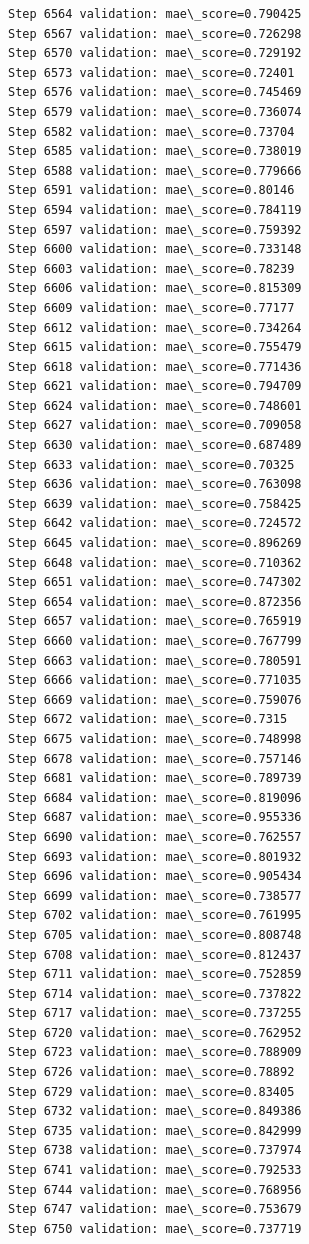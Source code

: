 \documentclass[11pt]{article}
\begin{document}
\begin{Verbatim}[commandchars=\\\{\}]
Step 6564 validation: mae\_score=0.790425
Step 6567 validation: mae\_score=0.726298
Step 6570 validation: mae\_score=0.729192
Step 6573 validation: mae\_score=0.72401
Step 6576 validation: mae\_score=0.745469
Step 6579 validation: mae\_score=0.736074
Step 6582 validation: mae\_score=0.73704
Step 6585 validation: mae\_score=0.738019
Step 6588 validation: mae\_score=0.779666
Step 6591 validation: mae\_score=0.80146
Step 6594 validation: mae\_score=0.784119
Step 6597 validation: mae\_score=0.759392
Step 6600 validation: mae\_score=0.733148
Step 6603 validation: mae\_score=0.78239
Step 6606 validation: mae\_score=0.815309
Step 6609 validation: mae\_score=0.77177
Step 6612 validation: mae\_score=0.734264
Step 6615 validation: mae\_score=0.755479
Step 6618 validation: mae\_score=0.771436
Step 6621 validation: mae\_score=0.794709
Step 6624 validation: mae\_score=0.748601
Step 6627 validation: mae\_score=0.709058
Step 6630 validation: mae\_score=0.687489
Step 6633 validation: mae\_score=0.70325
Step 6636 validation: mae\_score=0.763098
Step 6639 validation: mae\_score=0.758425
Step 6642 validation: mae\_score=0.724572
Step 6645 validation: mae\_score=0.896269
Step 6648 validation: mae\_score=0.710362
Step 6651 validation: mae\_score=0.747302
Step 6654 validation: mae\_score=0.872356
Step 6657 validation: mae\_score=0.765919
Step 6660 validation: mae\_score=0.767799
Step 6663 validation: mae\_score=0.780591
Step 6666 validation: mae\_score=0.771035
Step 6669 validation: mae\_score=0.759076
Step 6672 validation: mae\_score=0.7315
Step 6675 validation: mae\_score=0.748998
Step 6678 validation: mae\_score=0.757146
Step 6681 validation: mae\_score=0.789739
Step 6684 validation: mae\_score=0.819096
Step 6687 validation: mae\_score=0.955336
Step 6690 validation: mae\_score=0.762557
Step 6693 validation: mae\_score=0.801932
Step 6696 validation: mae\_score=0.905434
Step 6699 validation: mae\_score=0.738577
Step 6702 validation: mae\_score=0.761995
Step 6705 validation: mae\_score=0.808748
Step 6708 validation: mae\_score=0.812437
Step 6711 validation: mae\_score=0.752859
Step 6714 validation: mae\_score=0.737822
Step 6717 validation: mae\_score=0.737255
Step 6720 validation: mae\_score=0.762952
Step 6723 validation: mae\_score=0.788909
Step 6726 validation: mae\_score=0.78892
Step 6729 validation: mae\_score=0.83405
Step 6732 validation: mae\_score=0.849386
Step 6735 validation: mae\_score=0.842999
Step 6738 validation: mae\_score=0.737974
Step 6741 validation: mae\_score=0.792533
Step 6744 validation: mae\_score=0.768956
Step 6747 validation: mae\_score=0.753679
Step 6750 validation: mae\_score=0.737719

\end{Verbatim}
\end{document}
